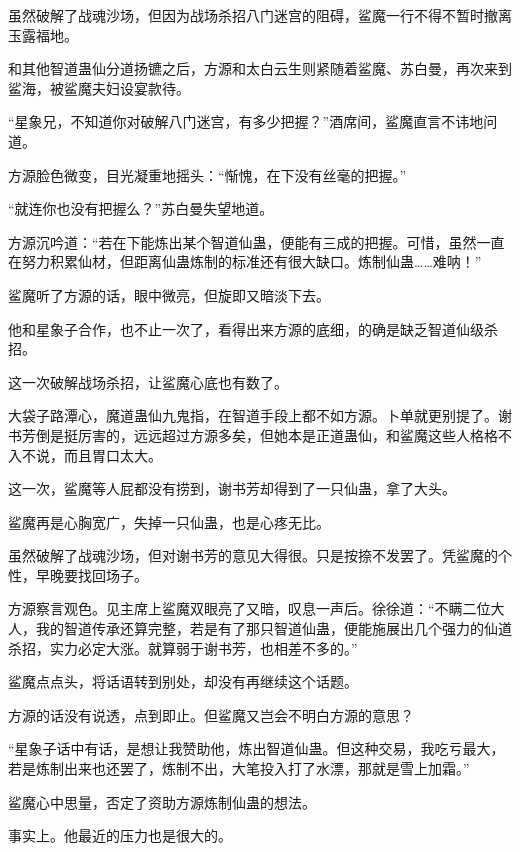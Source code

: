 
\begin{this_body}

虽然破解了战魂沙场，但因为战场杀招八门迷宫的阻碍，鲨魔一行不得不暂时撤离玉露福地。

和其他智道蛊仙分道扬镳之后，方源和太白云生则紧随着鲨魔、苏白曼，再次来到鲨海，被鲨魔夫妇设宴款待。

“星象兄，不知道你对破解八门迷宫，有多少把握？”酒席间，鲨魔直言不讳地问道。

方源脸色微变，目光凝重地摇头：“惭愧，在下没有丝毫的把握。”

“就连你也没有把握么？”苏白曼失望地道。

方源沉吟道：“若在下能炼出某个智道仙蛊，便能有三成的把握。可惜，虽然一直在努力积累仙材，但距离仙蛊炼制的标准还有很大缺口。炼制仙蛊……难呐！”

鲨魔听了方源的话，眼中微亮，但旋即又暗淡下去。

他和星象子合作，也不止一次了，看得出来方源的底细，的确是缺乏智道仙级杀招。

这一次破解战场杀招，让鲨魔心底也有数了。

大袋子路潭心，魔道蛊仙九鬼指，在智道手段上都不如方源。卜单就更别提了。谢书芳倒是挺厉害的，远远超过方源多矣，但她本是正道蛊仙，和鲨魔这些人格格不入不说，而且胃口太大。

这一次，鲨魔等人屁都没有捞到，谢书芳却得到了一只仙蛊，拿了大头。

鲨魔再是心胸宽广，失掉一只仙蛊，也是心疼无比。

虽然破解了战魂沙场，但对谢书芳的意见大得很。只是按捺不发罢了。凭鲨魔的个性，早晚要找回场子。

方源察言观色。见主席上鲨魔双眼亮了又暗，叹息一声后。徐徐道：“不瞒二位大人，我的智道传承还算完整，若是有了那只智道仙蛊，便能施展出几个强力的仙道杀招，实力必定大涨。就算弱于谢书芳，也相差不多的。”

鲨魔点点头，将话语转到别处，却没有再继续这个话题。

方源的话没有说透，点到即止。但鲨魔又岂会不明白方源的意思？

“星象子话中有话，是想让我赞助他，炼出智道仙蛊。但这种交易，我吃亏最大，若是炼制出来也还罢了，炼制不出，大笔投入打了水漂，那就是雪上加霜。”

鲨魔心中思量，否定了资助方源炼制仙蛊的想法。

事实上。他最近的压力也是很大的。


\end{this_body}
